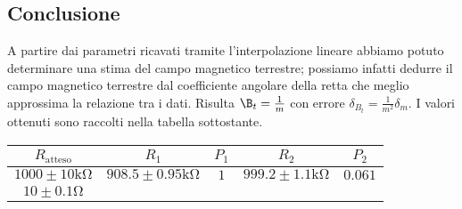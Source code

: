 \documentclass[a4paper]{article}
\begin{document}
\subsection{Conclusione}
A partire dai parametri ricavati tramite l'interpolazione lineare abbiamo potuto determinare una stima del campo magnetico terrestre;
possiamo infatti dedurre il campo magnetico terrestre dal coefficiente angolare della retta che meglio approssima la relazione tra i dati.
Risulta \( \B_t = \frac {1}{m} \) con errore \( \delta_B_t = \frac {1}{m^2}\delta_m \).
I valori ottenuti sono raccolti nella tabella sottostante.












\centering
\begin{tabular}{|c|c|c|c|c|}
	\hline
	$R_{\text{atteso}}$            & $R_1$                           & $P_1$ & $R_2$ & $P_2$ \\
	\hline
	$1000 \pm 10 \si{\kilo\ohm}$   & $908.5 \pm 0.95 \si{\kilo\ohm}$ & $1$   &
	$999.2 \pm 1.1 \si{\kilo\ohm}$ & $0.061$                                                 \\
	\hline
	$10 \pm 0.1 \si{\ohm}$         &                                 &       &       &       \\
	\hline
\end{tabular}
\label{tab:Verfica legge di Ohm}






\subsection{}
\end{document}
